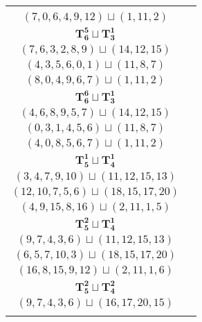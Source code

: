 \documentclass{article}
\begin{document}
\begin{longtable}{|c|c|}
\begin{tabular}{c}
        $(4,5,6,3,0,1)\sqcup(11,8,7)$ \\ 
        $(7,0,6,4,9,12)\sqcup(1,11,2)$
        \end{tabular} \\ 
        \hline
        $\mathbf{T_{6}^{5}} \sqcup \mathbf{T_{3}^{1}}$ & \begin{tabular}{c}
        $(0,2,4,7,1,5)\sqcup(12,11,13)$ \\ 
        $(7,6,3,2,8,9)\sqcup(14,12,15)$ \\ 
        $(4,3,5,6,0,1)\sqcup(11,8,7)$ \\ 
        $(8,0,4,9,6,7)\sqcup(1,11,2)$
        \end{tabular} \\ 
        \hline
        $\mathbf{T_{6}^{6}} \sqcup \mathbf{T_{3}^{1}}$ & \begin{tabular}{c}
        $(0,2,1,3,4,5)\sqcup(12,11,14)$ \\ 
        $(4,6,8,9,5,7)\sqcup(14,12,15)$ \\ 
        $(0,3,1,4,5,6)\sqcup(11,8,7)$ \\ 
        $(4,0,8,5,6,7)\sqcup(1,11,2)$
        \end{tabular} \\ 
        \hline
        $\mathbf{T_{5}^{1}} \sqcup \mathbf{T_{4}^{1}}$ & \begin{tabular}{c}
        $(2,4,6,9,12)\sqcup(16,15,14,13)$ \\ 
        $(3,4,7,9,10)\sqcup(11,12,15,13)$ \\ 
        $(12,10,7,5,6)\sqcup(18,15,17,20)$ \\ 
        $(4,9,15,8,16)\sqcup(2,11,1,5)$
        \end{tabular} \\ 
        \hline
        $\mathbf{T_{5}^{2}} \sqcup \mathbf{T_{4}^{1}}$ & \begin{tabular}{c}
        $(12,9,6,4,11)\sqcup(17,16,15,14)$ \\ 
        $(9,7,4,3,6)\sqcup(11,12,15,13)$ \\ 
        $(6,5,7,10,3)\sqcup(18,15,17,20)$ \\ 
        $(16,8,15,9,12)\sqcup(2,11,1,6)$
        \end{tabular} \\ 
        \hline
        $\mathbf{T_{5}^{2}} \sqcup \mathbf{T_{4}^{2}}$ & \begin{tabular}{c}
        $(4,6,9,11,8)\sqcup(16,15,18,14)$ \\ 
        $(9,7,4,3,6)\sqcup(16,17,20,15)$ \\ 

\end{tabular}
\end{longtable}
\end{document}

